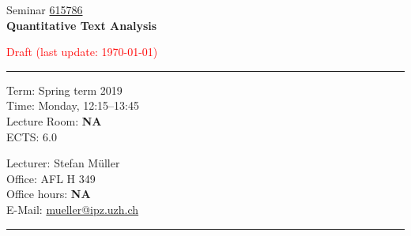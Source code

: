 \documentclass[abstract=on,parskip=full,headings=standardclasses,fontsize=11pt,paper=a4]{scrartcl}
\begin{document}
	
\singlespacing

\noindent
{}%
\hfill%

\singlespacing
\vspace{1cm}

\begin{center}
{\large Seminar \href{https://studentservices.uzh.ch/uzh/anonym/vvz/index.html#/details/2018/004/SM/50926554}{615786}} \\ 
\medskip
{\Large \textbf{Quantitative Text Analysis}} 
\bigskip

{\large  \textcolor{red}{Draft (last update: \today)}}
\end{center}

\vspace{1.5cm}

\hrule
\medskip
\begin{minipage}[t]{0.5\textwidth}
Term: Spring term 2019 \\
Time: Monday, 12:15--13:45 \\
Lecture Room: \textbf{NA} \\
ECTS: 6.0
\end{minipage}
\begin{minipage}[t]{0.5\textwidth}
\begin{flushright}
Lecturer: Stefan Müller \\
Office:  AFL H 349\\
Office hours: \textbf{NA} \\
E-Mail: \textsf{\href{mailto:mueller@ipz.uzh.ch}{mueller@ipz.uzh.ch}}
\end{flushright}
\end{minipage}
\medskip
\vspace{2.5mm}
\hrule 
\end{document}
